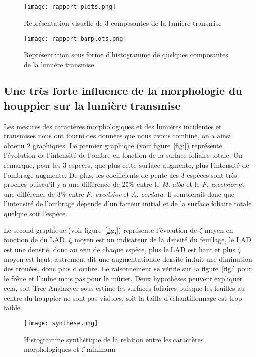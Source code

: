 ﻿\documentclass[12pt]{report}
\begin{document}
\begin{figure}
  \centering
  \texttt{[image: rapport\_plots.png]}
  \caption{Représentation visuelle de 3 composantes de la lumière transmise\label{fig:flux}}
\end{figure}

\begin{figure}
  \centering
  \texttt{[image: rapport\_barplots.png]}
  \caption{Représentation sous forme d'histogramme de quelques composantes de la lumière transmise\label{fig:barplots}}
\end{figure}


\subsection{Une très forte influence de la morphologie du houppier sur la lumière transmise}

Les mesures des caractères morphologiques et des lumières incidentes et
transmises nous ont fourni des données que nous avons combiné, on a ainsi obtenu
2 graphiques. Le premier graphique (voir figure~\ref{fig:}) représente
l'évolution de l'intensité de l'ombre en fonction de la surface foliaire totale.
On remarque, pour les 3 espèces, que plus cette surface augmente, plus
l'intensité de l'ombrage augmente. De plus, les coefficients de pente des 3
espèces sont très proches puisqu'il y a une différence de 25\% entre le
\textit{M. alba} et le \textit{F. excelsior} et une différence de 3\% entre
\textit{F. excelsior} et \textit{A. cordata}. Il semblerait donc que l'intensité
de l'ombrage dépende d'un facteur initial et de la surface foliaire totale
quelque soit l'espèce.

Le second graphique (voir figure~\ref{fig:}) représente l'évolution de $\zeta$
moyen en fonction de du LAD. $\zeta$ moyen est un indicateur de la densité du
feuillage, le LAD est une densité, donc au sein de chaque espèce, plus le LAD
est haut et plus $\zeta$ moyen est haut; autrement dit une augmentationde densité
induit une diminution des trouées, donc plus d'ombre. Le raisonnement se vérifie sur la
figure~\ref{fig:} pour le frêne et l'aulne mais pas pour le mûrier. Deux
hypothèses peuvent expliquer cela, soit Tree Analazyer sous-estime les
surfaces foliaires puisque les feuilles au centre du houppier ne sont pas
visibles, soit la taille d'échantillonnage est trop faible.


\begin{figure}
  \centering
  \texttt{[image: synthèse.png]}
  \caption{Histogramme synthétique de la relation entre les caractères morphologiques et $\zeta$ minimum\label{fig:synthèse}}
\end{figure}
\end{document}

